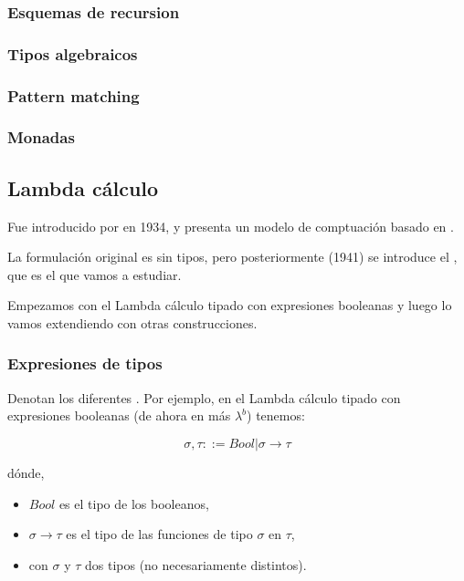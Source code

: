 \subsubsection{Esquemas de recursion}

\subsubsection{Tipos algebraicos}

\subsubsection{Pattern matching}

\subsubsection{Monadas}

\subsection{Lambda cálculo}

Fue introducido por  en 1934, y presenta un modelo de comptuación basado en .

La formulación original es sin tipos, pero posteriormente (1941) se introduce el , que es el que vamos a estudiar.

Empezamos con el Lambda cálculo tipado con expresiones booleanas y luego lo vamos extendiendo con otras construcciones.

\subsubsection{Expresiones de tipos}

Denotan los diferentes . Por ejemplo, en el Lambda cálculo tipado con expresiones booleanas (de ahora en más $\lambda^b$) tenemos:

\[ \sigma, \tau ::= Bool|\sigma\to\tau \]

dónde,
\begin{itemize}
  \item $Bool$ es el tipo de los booleanos,
  \item $\sigma\to\tau$ es el tipo de las funciones de tipo $\sigma$ en $\tau$,
  \item con $\sigma$ y $\tau$ dos tipos (no necesariamente distintos).
\end{itemize}

